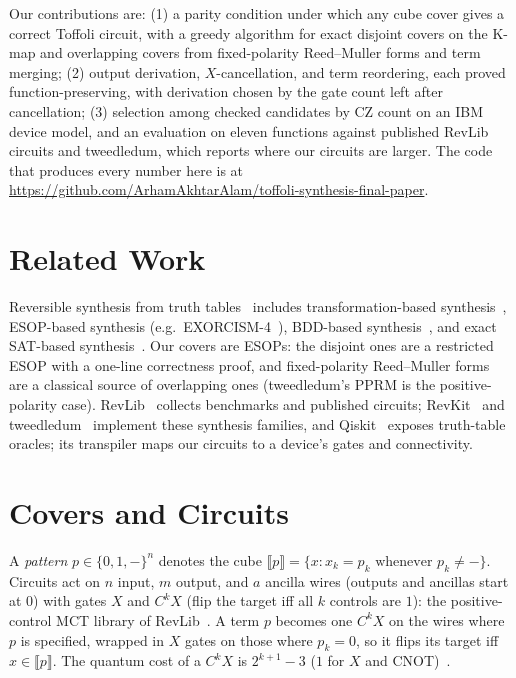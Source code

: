 \documentclass[conference]{IEEEtran}
\theoremstyle{plain}
\begin{document}
Our contributions are: (1) a parity condition under which any cube
cover gives a correct Toffoli circuit, with a greedy algorithm for exact
disjoint covers on the K-map and overlapping covers from fixed-polarity
Reed--Muller forms and term merging; (2) output derivation,
$X$-cancellation, and term reordering, each proved function-preserving,
with derivation chosen by the gate count left after cancellation;
(3) selection among checked candidates by CZ count on an IBM device
model, and an evaluation on eleven functions against published RevLib
circuits and tweedledum, which reports where our circuits are larger. The code that produces every number here is at
\url{https://github.com/ArhamAkhtarAlam/toffoli-synthesis-final-paper}.

\section{Related Work}
Reversible synthesis from truth tables~\cite{saeedi2013} includes
transformation-based synthesis~\cite{miller2003}, ESOP-based synthesis
(e.g.\ EXORCISM-4~\cite{mishchenko2001}), BDD-based
synthesis~\cite{wille2009bdd}, and exact SAT-based
synthesis~\cite{grosse2008}. Our covers are ESOPs: the disjoint ones are a
restricted ESOP with a one-line correctness proof, and fixed-polarity
Reed--Muller forms~\cite{saeedi2013} are a classical source of
overlapping ones (tweedledum's PPRM is the positive-polarity case). RevLib~\cite{revlib2008} collects
benchmarks and published circuits; RevKit~\cite{soeken2012revkit} and
tweedledum~\cite{schmitt2022} implement these synthesis families, and
Qiskit~\cite{qiskit2024} exposes truth-table oracles; its transpiler
maps our circuits to a device's gates and connectivity.

\section{Covers and Circuits}
A \emph{pattern} $p\in\{0,1,-\}^n$ denotes the cube $\llbracket
p\rrbracket=\{x : x_k=p_k \text{ whenever } p_k\neq -\}$. Circuits act
on $n$ input, $m$ output, and $a$ ancilla wires (outputs and ancillas
start at $0$) with gates $X$ and $C^kX$ (flip the target iff all $k$
controls are $1$): the positive-control MCT library of
RevLib~\cite{revlib2008}. A term $p$ becomes one $C^kX$ on the wires
where $p$ is specified, wrapped in $X$ gates on those where $p_k=0$, so
it flips its target iff $x\in\llbracket p\rrbracket$. The quantum cost
of a $C^kX$ is $2^{k+1}-3$ ($1$ for $X$ and CNOT)~\cite{barenco1995,revlib2008}.
\end{document}
